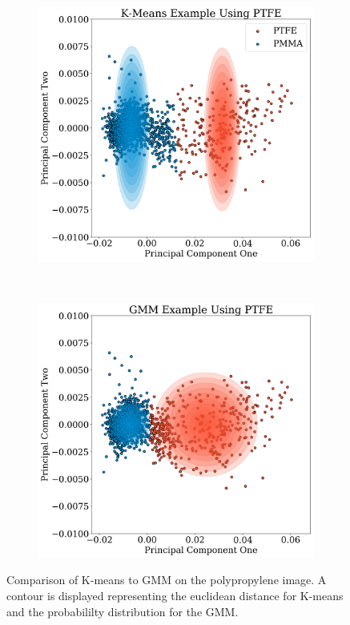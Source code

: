 \documentclass[a4paper,11pt]{article}
\begin{document}
\begin{figure}[t!]
    \centering
    \begin{subfigure}[b]{0.48\textwidth}
        \includegraphics[width=\textwidth]{figures/Kmeans.png}
    \end{subfigure}
    ~ %
    \begin{subfigure}[b]{0.48\textwidth}
        \includegraphics[width=\textwidth]{figures/GMM.png}
    \end{subfigure}

    \caption{Comparison of K-means to GMM on the polypropylene image. A contour is displayed representing the  euclidean distance for K-means and the probabililty distribution for the GMM.}
    \label{clustering_methods}
\end{figure}
\end{document}
